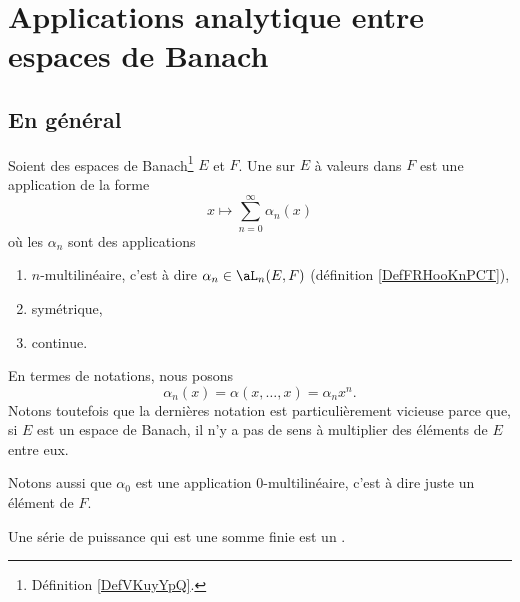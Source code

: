 

\section{Applications analytique entre espaces de Banach}

\subsection{En général}


\begin{definition}	\label{DEFooIXGBooPgJTzB}
	Soient des espaces de Banach\footnote{Définition \ref{DefVKuyYpQ}.} \( E\) et \( F\).
	Une  sur \( E\) à valeurs dans \( F\) est une application de la forme
	\begin{equation}
		x\mapsto \sum_{n=0}^{\infty}\alpha_n(x)
	\end{equation}
	où les \( \alpha_n\) sont des applications
	\begin{enumerate}
		\item
		      \( n\)-multilinéaire, c'est à dire \( \alpha_n\in \aL_n(E,F)\) (définition \ref{DefFRHooKnPCT}),
		\item
		      symétrique,
		\item
		      continue.
	\end{enumerate}
	En termes de notations, nous posons
	\begin{equation}
		\alpha_n(x)=\alpha(x,\ldots,x)=\alpha_nx^n.
	\end{equation}
	Notons toutefois que la dernières notation est particulièrement vicieuse parce que, si \( E\) est un espace de Banach, il n'y a pas de sens à multiplier des éléments de \( E\) entre eux.

	Notons aussi que \( \alpha_0\) est une application \( 0\)-multilinéaire, c'est à dire juste un élément de \( F\).
\end{definition}

\begin{definition}	\label{DEFooZUYHooDwwRfp}
	Une série de puissance qui est une somme finie est un .
\end{definition}

